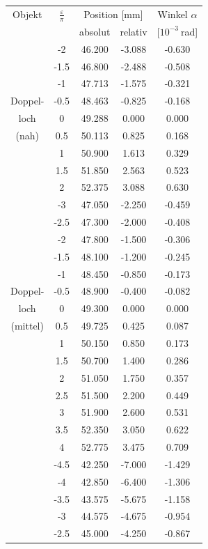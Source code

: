 \documentclass[12pt,a4paper,titlepage,headinclude,bibtotoc]{scrartcl}
\begin{document}
\begin{table}[!htb]
	\centering
	\begin{tabular}{|c||c|c|c|c|}
		\hline		
		Objekt & $\frac{\varepsilon}{\pi}$ & \multicolumn{2}{c}{Position [mm]} & Winkel $\alpha$ \\
		& & absolut & relativ & [$10^{-3}~$rad] \\
		\hline
		\hline
		&	-2	&	46.200	&	-3.088	&	-0.630	\\
		&	-1.5	&	46.800	&	-2.488	&	-0.508	\\
		&	-1	&	47.713	&	-1.575	&	-0.321	\\
		Doppel- &	-0.5	&	48.463	&	-0.825	&	-0.168	\\
		loch &	0	&	49.288	&	0.000	&	0.000	\\
		(nah) &	0.5	&	50.113	&	0.825	&	0.168	\\
		&	1	&	50.900	&	1.613	&	0.329	\\
		&	1.5	&	51.850	&	2.563	&	0.523	\\
		&	2	&	52.375	&	3.088	&	0.630	\\
		\hline
		&	-3	&	47.050	&	-2.250	&	-0.459	\\
		&	-2.5	&	47.300	&	-2.000	&	-0.408	\\
		&	-2	&	47.800	&	-1.500	&	-0.306	\\
		&	-1.5	&	48.100	&	-1.200	&	-0.245	\\
		&	-1	&	48.450	&	-0.850	&	-0.173	\\
		Doppel- &	-0.5	&	48.900	&	-0.400	&	-0.082	\\
		loch &	0	&	49.300	&	0.000	&	0.000	\\
		(mittel) &	0.5	&	49.725	&	0.425	&	0.087	\\
		&	1	&	50.150	&	0.850	&	0.173	\\
		&	1.5	&	50.700	&	1.400	&	0.286	\\
		&	2	&	51.050	&	1.750	&	0.357	\\
		&	2.5	&	51.500	&	2.200	&	0.449	\\
		&	3	&	51.900	&	2.600	&	0.531	\\
		&	3.5	&	52.350	&	3.050	&	0.622	\\
		&	4	&	52.775	&	3.475	&	0.709	\\
		\hline
		&	-4.5	&	42.250	&	-7.000	&	-1.429	\\
		&	-4	&	42.850	&	-6.400	&	-1.306	\\
		&	-3.5	&	43.575	&	-5.675	&	-1.158	\\
		&	-3	&	44.575	&	-4.675	&	-0.954	\\
		&	-2.5	&	45.000	&	-4.250	&	-0.867	\\

\end{tabular}
\end{table}
\end{document}
